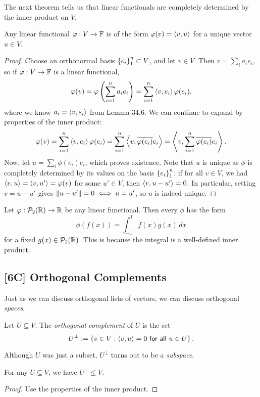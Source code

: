 \documentclass{article}
\begin{document}
The next theorem tells us that linear functionals are completely determined by the inner product on $V$.
\begin{theorem}
Any linear functional $\varphi: V\to \mathbb F$ is of the form $\varphi(v) = \left\langle v, u\right\rangle$ for a unique vector $u\in V$.
\end{theorem}
\begin{proof}
Choose an orthonormal basis $\left\{e_i\right\}_1^n \subset V$, and let $v\in V$. Then $v = \sum_i a_ie_i$, so if $\varphi: V\to \mathbb F$ is a linear functional,
$$\varphi(v) = \varphi\left(\sum_{i=1}^n a_ie_i \right) = \sum_{i=1}^n \left\langle v, e_i\right\rangle\varphi(e_i),$$
where we know $a_i = \left\langle v, e_i\right\rangle$ from Lemma 34.6. We can continue to expand by properties of the inner product:
$$\varphi(v) = \sum_{i=1}^n \left\langle v, e_i\right\rangle\varphi(e_i) = \sum_{i=1}^n \left\langle v, \overline{\varphi(e_i)}e_i\right\rangle = \left\langle v, \sum_{i=1}^n \overline{\varphi(e_i)}e_i\right\rangle.$$
Now, let $u = \sum_i \overline{\phi(e_i)}e_i$, which proves existence. Note that $u$ is unique as $\phi$ is completely determined by its values on the basis $\left\{e_i\right\}_1^n$: if for all $v\in V$, we had $\left\langle v,u\right\rangle =\left\langle v, u'\right\rangle = \varphi(v)$ for some $u'\in V$, then $\left\langle v, u-u'\right\rangle=0$. In particular, setting $v = u-u'$ gives $\left\Vert u - u'\right\Vert = 0 \iff u = u'$, so $u$ is indeed unique.
\end{proof}
\begin{example}
Let $\varphi: \mathcal P_2(\mathbb R)\to \mathbb R$ be any linear functional. Then every $\phi$ has the form
$$\phi(f(x)) = \int_{-1}^1 f(x) g(x)\, dx$$
for a fixed $g(x)\in\mathcal P_2(\mathbb R)$. This is because the integral is a well-defined inner product.
\end{example}
\subsection*{[6C] Orthogonal Complements}
Just as we can discuss orthogonal lists of vectors, we can discuss orthogonal \textit{spaces}.
\begin{definition}
Let $U\subseteq V$. The \textit{orthogonal complement} of $U$ is the set
$$U^\perp := \left\{v\in V: \left\langle v,u\right\rangle = 0 \textsf{ for all } u\in U\right\}.$$
\end{definition}
Although $U$ was just a subset, $U^\perp$ turns out to be a \textit{subspace}.\newpage
\begin{proposition}
For any $U\subseteq V$, we have $U^\perp \leq V$.
\end{proposition}
\begin{proof}
Use the properties of the inner product.
\end{proof}
\end{document}
